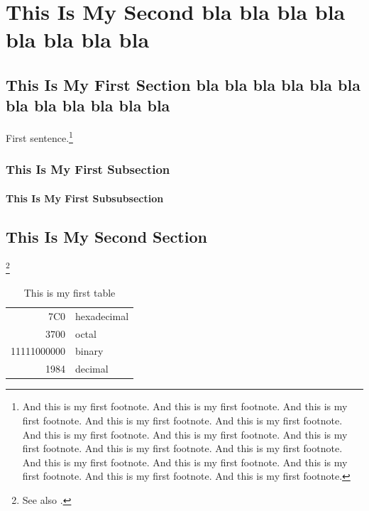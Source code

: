 % 

\chapter{This Is My Second bla bla bla bla bla bla bla bla}
\section{This Is My First Section bla bla bla bla bla bla bla bla bla bla bla bla }
\noindent
First sentence.\footnote{And this is my first footnote. And this is my first footnote. And this is my first footnote. And this is my first footnote. And this is my first footnote. And this is my first footnote. And this is my first footnote. And this is my first footnote. And this is my first footnote. And this is my first footnote. And this is my first footnote. And this is my first footnote. And this is my first footnote. And this is my first footnote. And this is my first footnote.}

\subsection{This Is My First Subsection}
\noindent
\cite{texbook} 







\subsubsection{This Is My First Subsubsection}
\noindent
\cite{texbook}







\section{This Is My Second Section}
\noindent
\footnote{See also \cite{Aup91,Dou72,Hal82}.}








\begin{table}[h]
  \begin{center}
\begin{tabular}{|r|l|}
  \hline
  7C0 & hexadecimal \\
  3700 & octal \\ \cline{2-2}
  11111000000 & binary \\
  \hline \hline
  1984 & decimal \\
  \hline
\end{tabular}
\caption{This is my first table}
\end{center}
\end{table}


